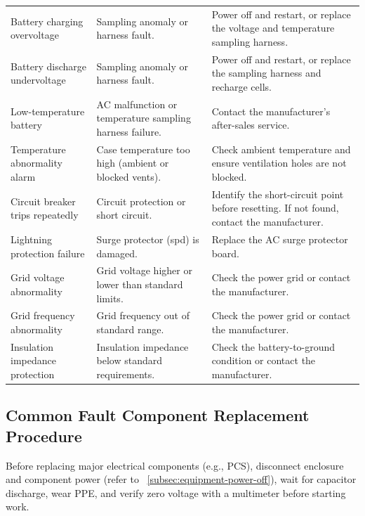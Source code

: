 \documentclass[11pt, a4paper]{article}
\newcommand{\sffont}{\sffamily\fontseries{b}\selectfont}
\begin{document}
\begin{xltabular}{\textwidth}{>{\sffont\raggedright\arraybackslash}X >{\raggedright\arraybackslash}X >{\raggedright\arraybackslash}X}
Battery charging overvoltage & Sampling anomaly or harness fault. & Power off and restart, or replace the voltage and temperature sampling harness. \\ \addlinespace
Battery discharge undervoltage & Sampling anomaly or harness fault. & Power off and restart, or replace the sampling harness and recharge cells. \\ \addlinespace
Low-temperature battery & AC malfunction or temperature sampling harness failure. & Contact the manufacturer's after-sales service. \\ \addlinespace
Temperature abnormality alarm & Case temperature too high (ambient or blocked vents). & Check ambient temperature and ensure ventilation holes are not blocked. \\ \addlinespace
Circuit breaker trips repeatedly & Circuit protection or short circuit. & Identify the short-circuit point before resetting. If not found, contact the manufacturer. \\ \addlinespace
Lightning protection failure & Surge protector (\gls{spd}) is damaged. & Replace the AC surge protector board. \\ \addlinespace
Grid voltage abnormality & Grid voltage higher or lower than standard limits. & Check the power grid or contact the manufacturer. \\ \addlinespace
Grid frequency abnormality & Grid frequency out of standard range. & Check the power grid or contact the manufacturer. \\ \addlinespace
Insulation impedance protection & Insulation impedance below standard requirements. & Check the battery-to-ground condition or contact the manufacturer. \\
\end{xltabular}

\subsection{Common Fault Component Replacement Procedure}
Before replacing major electrical components (e.g., PCS), disconnect enclosure and component power (refer to ~\ref{subsec:equipment-power-off}), wait for capacitor discharge, wear PPE, and verify zero voltage with a multimeter before starting work.
\end{document}
